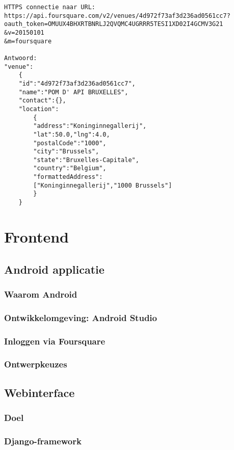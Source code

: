\begin{lstlisting}[caption={Voorbeeld: werking Foursquare API},label=lst:vb_foursquare_api]
HTTPS connectie naar URL:
https://api.foursquare.com/v2/venues/4d972f73af3d236ad0561cc7?
oauth_token=OMUUX4BHXRTBNRLJ2QVQMC4UGRRR5TESI1XD02I4GCMV3G21
&v=20150101
&m=foursquare

Antwoord:
"venue":
	{
	"id":"4d972f73af3d236ad0561cc7",
	"name":"POM D' API BRUXELLES",
	"contact":{},
	"location":
		{
		"address":"Koninginnegallerij",
		"lat":50.0,"lng":4.0,
		"postalCode":"1000",
		"city":"Brussels",
		"state":"Bruxelles-Capitale",
		"country":"Belgium",
		"formattedAddress":
		["Koninginnegallerij","1000 Brussels"]
		}
	}
\end{lstlisting}
 


\section{Frontend}
\subsection{Android applicatie}
\subsubsection{Waarom Android}
% 
\subsubsection{Ontwikkelomgeving: Android Studio}
\subsubsection{Inloggen via Foursquare}

\subsubsection{Ontwerpkeuzes}

\subsection{Webinterface}
\subsubsection{Doel}
\subsubsection{Django-framework}
